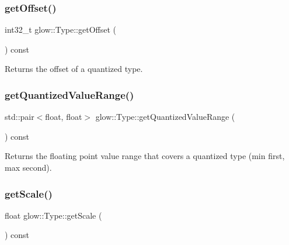 \subsubsection{\texorpdfstring{get\+Offset()}{getOffset()}}
{\footnotesize\ttfamily int32\+\_\+t glow\+::\+Type\+::get\+Offset (\begin{DoxyParamCaption}{ }\end{DoxyParamCaption}) const\hspace{0.3cm}{\ttfamily [inline]}}

\begin{DoxyReturn}{Returns}
the offset of a quantized type. 
\end{DoxyReturn}
\mbox{\label{structglow_1_1_type_ad654242804d0f47b169b9548a1d2cb48}} 
\subsubsection{\texorpdfstring{get\+Quantized\+Value\+Range()}{getQuantizedValueRange()}}
{\footnotesize\ttfamily std\+::pair$<$float, float$>$ glow\+::\+Type\+::get\+Quantized\+Value\+Range (\begin{DoxyParamCaption}{ }\end{DoxyParamCaption}) const\hspace{0.3cm}{\ttfamily [inline]}}

\begin{DoxyReturn}{Returns}
the floating point value range that covers a quantized type (min first, max second). 
\end{DoxyReturn}
\mbox{\label{structglow_1_1_type_a1567f59601da95164a15e2071db498c4}} 
\subsubsection{\texorpdfstring{get\+Scale()}{getScale()}}
{\footnotesize\ttfamily float glow\+::\+Type\+::get\+Scale (\begin{DoxyParamCaption}{ }\end{DoxyParamCaption}) const\hspace{0.3cm}{\ttfamily [inline]}}

